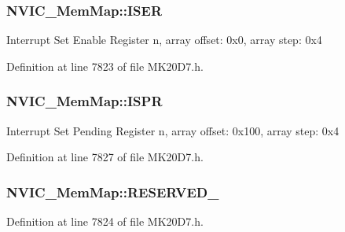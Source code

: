 \subsubsection[{\texorpdfstring{I\+S\+ER}{ISER}}]{ N\+V\+I\+C\+\_\+\+Mem\+Map\+::\+I\+S\+ER}\hypertarget{struct_n_v_i_c___mem_map_a4cfa36b02c8364f60adb7767ee8753fd}{}\label{struct_n_v_i_c___mem_map_a4cfa36b02c8364f60adb7767ee8753fd}
Interrupt Set Enable Register n, array offset\+: 0x0, array step\+: 0x4 

Definition at line 7823 of file M\+K20\+D7.\+h.

\subsubsection[{\texorpdfstring{I\+S\+PR}{ISPR}}]{ N\+V\+I\+C\+\_\+\+Mem\+Map\+::\+I\+S\+PR}\hypertarget{struct_n_v_i_c___mem_map_a932539bc859aba0683074746faf980f6}{}\label{struct_n_v_i_c___mem_map_a932539bc859aba0683074746faf980f6}
Interrupt Set Pending Register n, array offset\+: 0x100, array step\+: 0x4 

Definition at line 7827 of file M\+K20\+D7.\+h.

\subsubsection[{\texorpdfstring{R\+E\+S\+E\+R\+V\+E\+D\+\_\+0}{RESERVED_0}}]{ N\+V\+I\+C\+\_\+\+Mem\+Map\+::\+R\+E\+S\+E\+R\+V\+E\+D\+\_}\hypertarget{struct_n_v_i_c___mem_map_a3d561c222264315032b893df6557d2b4}{}\label{struct_n_v_i_c___mem_map_a3d561c222264315032b893df6557d2b4}


Definition at line 7824 of file M\+K20\+D7.\+h.

